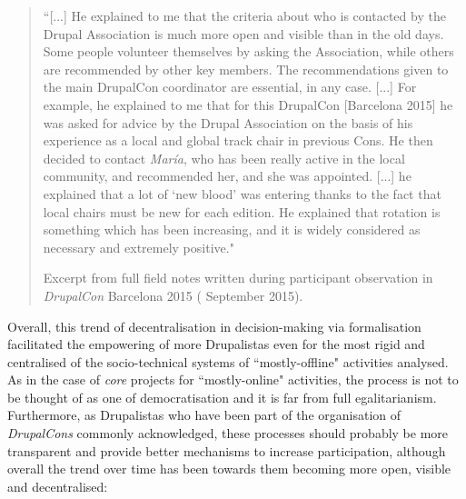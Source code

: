 \begin{quotation}
``[...] He explained to me that the criteria about who is contacted by the Drupal Association is much more open and visible than in the old days. Some people volunteer themselves by asking the Association, while others are recommended by other key members. The recommendations given to the main DrupalCon coordinator are essential, in any case. [...] For example, he explained to me that for this DrupalCon [Barcelona 2015] he was asked for advice by the Drupal Association on the basis of his experience as a local and global track chair in previous Cons. He then decided to contact \textit{María}, who has been really active in the local community, and recommended her, and she was appointed. [...] he explained that a lot of `new blood' was entering thanks to the fact that local chairs must be new for each edition. He explained that rotation is something which has been increasing, and it is widely considered as necessary and extremely positive."

\begin{flushright}\footnotesize{Excerpt from full field notes written during participant observation in \textit{DrupalCon} Barcelona 2015 ( September 2015).}\end{flushright}
\end{quotation}

Overall, this trend of decentralisation in decision-making via formalisation facilitated the empowering of more Drupalistas even for the most rigid and centralised of the socio-technical systems of ``mostly-offline" activities analysed. As in the case of \textit{core} projects for ``mostly-online" activities, the process is not to be thought of as one of democratisation and it is far from full egalitarianism. Furthermore, as Drupalistas who have been part of the organisation of \textit{DrupalCons} commonly acknowledged, these processes should probably be more transparent and provide better mechanisms to increase participation, although overall the trend over time has been towards them becoming more open, visible and decentralised:

